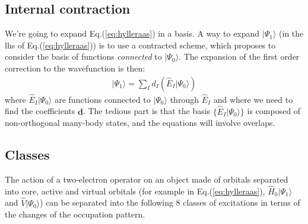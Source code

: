 \documentclass{article}
\newcommand  \equ[2]       {\begin{align}#2\label{#1}\end{align}}
\renewcommand\b[1]         {\mathbf{#1}}
\newcommand  \ket[1]       {\vert #1  \rangle}
\begin{document}
\subsection{Internal contraction}

We're going to expand Eq.(\ref{eq:hylleraas}) in a basis.
A way to expand $\ket{\Psi_1}$ (in the lhs of Eq.(\ref{eq:hylleraas})) is to use a contracted scheme,
which proposes to consider the basis of functions \textit{connected} to $\ket{\Psi_0}$.
The expansion of the first order correction to the wavefunction is then:
\equ{}{
  \ket{\Psi_1}=\sum_{I} d_I \left(\hat{E}_{I}\ket{\Psi_0}\right)
}
where $\hat{E}_{I}\ket{\Psi_0}$ are functions connected to $\ket{\Psi_0}$ through $\hat{E}_I$
and where we need to find the coefficients $\b{d}$.
The tedious part is that the basis $\{\hat{E}_{I }\ket{\Psi_0}\}$ is composed of non-orthogonal many-body states,
and the equations will involve overlaps.

\subsection{Classes}

The action of a two-electron operator on an object made of orbitals separated into
core, active and virtual orbitals
(for example in Eq.(\ref{eq:hylleraas}), $\hat{H}_0\ket{\Psi_1}$ and $\hat{V}\ket{\Psi_0}$)
can be separated into the following 8 classes of excitations in terms of the changes of the occupation pattern.
\end{document}
